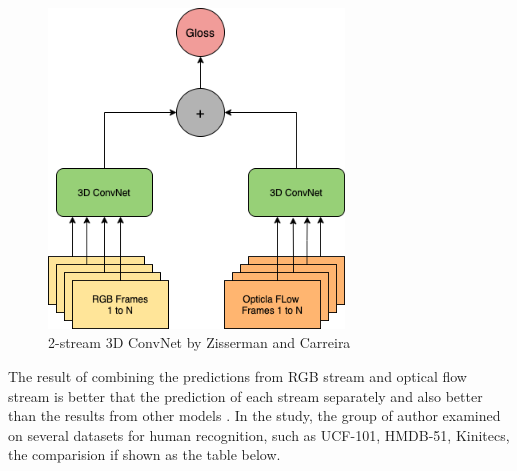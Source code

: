 \documentclass[a4paper, 12pt]{article}
\begin{document}
\begin{figure}[H]
    \centering
    \includegraphics[width=0.7\textwidth]{2-stream I3D Model.png}
    \caption{2-stream 3D ConvNet by Zisserman and Carreira \citep{carreira2017quo}}
    \label{Figure 2-Stream 3D ConvNet}
\end{figure}

 The result of combining the predictions from RGB stream and optical flow stream is better that the prediction of each stream separately and also better than the results from other models \citep{carreira2017quo}. In the study, the group of author examined on several datasets for human recognition, such as UCF-101, HMDB-51, Kinitecs, the comparision if shown as the table below.

\begin{table}[H]
    \centering
    \caption{Comparision betwen models on several human activity datasets \citep{carreira2017quo}}
    \label{table comparision result of models}
\end{table}
\end{document}

